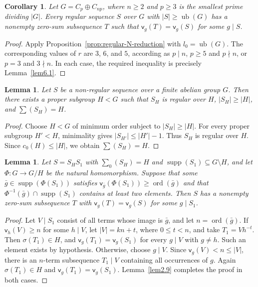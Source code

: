 \documentclass[10pt,reqno]{amsart}
\newtheorem{cor}[thm]{Corollary}
\newtheorem{lem}[thm]{Lemma}
\theoremstyle{definition}
\theoremstyle{remark}
\numberwithin{equation}{section}
\DeclareMathOperator{\ord}{ord}
\DeclareMathOperator{\supp}{supp}
\begin{document}
\begin{cor}\label{cor:regular-main}
Let $G=C_p\oplus C_{np}$, where $n\ge2$ and $p\ge3$ is the
smallest prime dividing $|G|$. Every regular sequence $S$ over $G$
with $|S|\ge \operatorname{ub}(G)$ has a nonempty zero-sum subsequence $T$ such that
$\mathsf v_g(T)=\mathsf v_g(S)$ for some $g\mid S$.
\end{cor}
\begin{proof}
Apply Proposition~\ref{prop:regular-N-reduction} with $l_0=\operatorname{ub}(G)$.
The corresponding values of $r$ are $3$, $6$, and $5$,
according as $p\mid n$, $p\ge5$ and $p\nmid n$, or
$p=3$ and $3\nmid n$.
In each case, the required inequality is precisely
Lemma~\ref{lem6.1}.
\end{proof}

\begin{lem}\label{lem:4.0}
Let $S$ be a non-regular sequence over a finite abelian group $G$.
Then there exists a proper subgroup $H<G$ such that $S_H$
is regular over $H$, $|S_H|\ge|H|$, and $\sum(S_H)=H$.
\end{lem}

\begin{proof}
Choose $H<G$ of minimum order subject to $|S_H|\ge|H|$.
For every proper subgroup $H'<H$, minimality gives
$|S_{H'}|\le|H'|-1$. Thus $S_H$ is regular over $H$.
Since $c_0(H)\le|H|$, we obtain $\sum(S_H)=H$.
\end{proof}

\begin{lem}\label{lem:N-heavy-fiber}
Let $S=S_HS_1$ with $\sum_0(S_H)=H$ and
$\supp(S_1)\subseteq G\setminus H$, and let $\Phi:G\to G/H$
be the natural homomorphism.
Suppose that some $\bar g\in\supp(\Phi(S_1))$ satisfies
$\mathsf v_{\bar g}(\Phi(S_1))\ge\ord(\bar g)$ and that
$\Phi^{-1}(\bar g)\cap\supp(S_1)$ contains at least two elements.
Then $S$ has a nonempty zero-sum subsequence $T$ with
$\mathsf v_g(T)=\mathsf v_g(S)$ for some $g\mid S_1$.
\end{lem}

\begin{proof}
Let $V\mid S_1$ consist of all terms whose image is $\bar g$,
and let $n=\ord(\bar g)$.
If $\mathsf v_h(V)\ge n$ for some $h\mid V$, let $|V|=kn+t$,
where $0\le t<n$, and take $T_1=Vh^{-t}$.
Then $\sigma(T_1)\in H$, and
$\mathsf v_g(T_1)=\mathsf v_g(S_1)$ for every $g\mid V$ with $g\ne h$.
Such an element exists by hypothesis.
Otherwise, choose $g\mid V$. Since $\mathsf v_g(V)<n\le|V|$,
there is an $n$-term subsequence $T_1\mid V$ containing all occurrences
of $g$. Again $\sigma(T_1)\in H$ and
$\mathsf v_g(T_1)=\mathsf v_g(S_1)$.
Lemma~\ref{lem2.9} completes the proof in both cases.
\end{proof}
\end{document}
